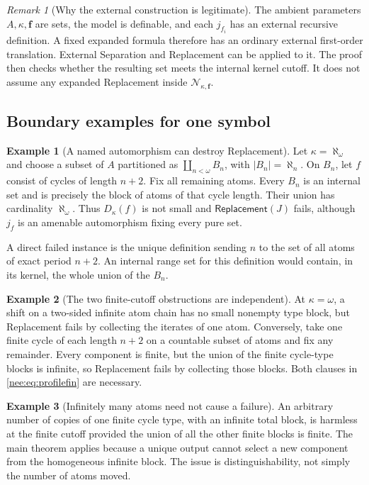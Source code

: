 \documentclass[11pt,letterpaper]{article}
\numberwithin{equation}{section}
\theoremstyle{plain}
\theoremstyle{definition}
\newtheorem{example}[example]{Example}
\theoremstyle{remark}
\newtheorem{remark}[remark]{Remark}
\newcommand{\Rep}{\mathsf{Replacement}}
\begin{document}
\begin{remark}[Why the external construction is legitimate]
The ambient parameters $A,\kappa,\boldsymbol f$ are sets, the model is definable, and each $j_{f_i}$ has an external recursive definition. A fixed expanded formula therefore has an ordinary external first-order translation. External Separation and Replacement can be applied to it. The proof then checks whether the resulting set meets the internal kernel cutoff. It does not assume any expanded Replacement inside $\mathcal N_{\kappa,\boldsymbol f}$.
\end{remark}

\subsection{Boundary examples for one symbol}
\begin{example}[A named automorphism can destroy Replacement]\label{nee:ex:alephomega}
Let $\kappa=\aleph_\omega$ and choose a subset of $A$ partitioned as $\coprod_{n<\omega}B_n$, with $|B_n|=\aleph_n$. On $B_n$, let $f$ consist of cycles of length $n+2$. Fix all remaining atoms. Every $B_n$ is an internal set and is precisely the block of atoms of that cycle length. Their union has cardinality $\aleph_\omega$. Thus $D_\kappa(f)$ is not small and $\Rep(J)$ fails, although $j_f$ is an amenable automorphism fixing every pure set.

A direct failed instance is the unique definition sending $n$ to the set of all atoms of exact period $n+2$. An internal range set for this definition would contain, in its kernel, the whole union of the $B_n$.
\end{example}

\begin{example}[The two finite-cutoff obstructions are independent]\label{nee:ex:finite}
At $\kappa=\omega$, a shift on a two-sided infinite atom chain has no small nonempty type block, but Replacement fails by collecting the iterates of one atom. Conversely, take one finite cycle of each length $n+2$ on a countable subset of atoms and fix any remainder. Every component is finite, but the union of the finite cycle-type blocks is infinite, so Replacement fails by collecting those blocks. Both clauses in \eqref{nee:eq:profilefin} are necessary.
\end{example}

\begin{example}[Infinitely many atoms need not cause a failure]
An arbitrary number of copies of one finite cycle type, with an infinite total block, is harmless at the finite cutoff provided the union of all the other finite blocks is finite. The main theorem applies because a unique output cannot select a new component from the homogeneous infinite block. The issue is distinguishability, not simply the number of atoms moved.
\end{example}
\end{document}
